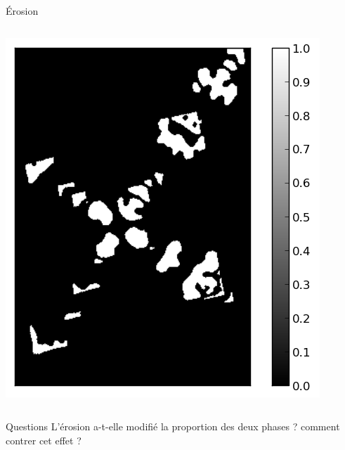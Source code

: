 \documentclass[8pt,a4paper]{beamer}
\begin{document}
\begin{frame}{\'Erosion}
 \begin{columns}
\includegraphics[width=1.\textwidth]{figures/image_erosion.png}

\end{columns}
\begin{alertblock}{Questions}
L'érosion a-t-elle modifié la proportion des deux phases ? comment contrer cet effet ?
\end{alertblock}
\end{frame}
\end{document}
